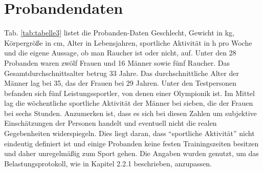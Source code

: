 \section{Probandendaten}
%
Tab. \ref{tab:tabelle3} listet die Probanden-Daten Geschlecht, Gewicht in \si{\kilogram}, Körpergröße in \si{\centi\metre}, Alter in Lebensjahren, sportliche Aktivität in \si{\hour} pro Woche und die eigene Aussage, ob man Raucher ist oder nicht, auf. Unter den 28 Probanden waren zwölf Frauen und 16 Männer sowie fünf Raucher. Das Gesamtdurchschnittsalter betrug 33 Jahre. Das durchschnittliche Alter der Männer lag bei 35, das der Frauen bei 29 Jahren. Unter den Testpersonen befanden sich fünf Leistungssportler, von denen einer Olympionik ist. Im Mittel lag die wöchentliche sportliche Aktivität der Männer bei sieben, die der Frauen bei sechs Stunden. Anzumerken ist, dass es sich bei diesen Zahlen um subjektive Einschätzungen der Personen handelt und eventuell nicht die realen Gegebenheiten widerspiegeln. Dies liegt daran, dass "`sportliche Aktivität"' nicht eindeutig definiert ist und einige Probanden keine festen Trainingszeiten besitzen und daher unregelmäßig zum Sport gehen. Die Angaben wurden genutzt, um das Belastungsprotokoll, wie in Kapitel 2.2.1 beschrieben, anzupassen.
%
